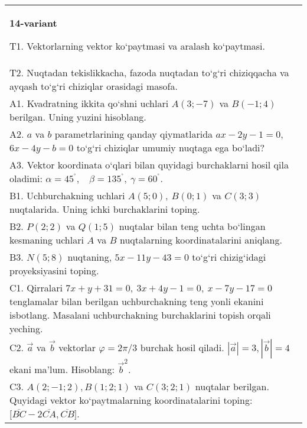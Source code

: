 \documentclass{article}
\begin{document}
\begin{tabular}{m{17cm}}
\textbf{14-variant}

T1. 
Vektorlarning vektor ko‘paytmasi va aralash ko‘paytmasi.
 \\
T2. 
Nuqtadan tekislikkacha, fazoda nuqtadan to‘g‘ri chiziqqacha va ayqash to‘g‘ri chiziqlar orasidagi masofa.
 \\
A1. 
Kvadratning ikkita qo‘shni uchlari $A (3; -7)$ va
$B (-1;4) $ berilgan. Uning yuzini hisoblang.
 \\
A2. 
$a$ va $b$ parametrlarining qanday qiymatlarida
$ax-2y-1=0$, $6x-4y-b=0$ to‘g‘ri chiziqlar umumiy nuqtaga ega bo‘ladi?
 \\
A3. 
Vektor koordinata o‘qlari bilan quyidagi burchaklarni hosil qila oladimi:
$\alpha = 45^{{^\circ}},\ \ \ \ \beta = 135^{{^\circ}},\ \gamma = 60^{{^\circ}}$.
 \\
B1. 
Uchburchakning uchlari \(A (5;0),\ B (0;1) \) va \(C (3;3) \)
nuqtalarida. Uning ichki burchaklarini toping.
 \\
B2. 
\(P (2;2) \) va \(Q (1;5) \) nuqtalar bilan teng uchta
bo‘lingan kesmaning uchlari $A$ va $B$ nuqtalarning
koordinatalarini aniqlang.
 \\
B3. 
\(N (5;8) \) nuqtaning, \(5x-11y-43=0\) to‘g‘ri chizig‘idagi
proyeksiyasini toping.
 \\
C1. 
Qirralari
\(7x+y+31=0,\ 3x+4y-1=0,\ x-7y-17=0\) tenglamalar
bilan berilgan uchburchakning teng yonli ekanini isbotlang.
Masalani uchburchakning
burchaklarini topish orqali yeching.
 \\
C2. 
$\vec{a}$ va $\vec{b}$ vektorlar $\varphi = 2\pi/3$ burchak hosil qiladi. $|\vec{a}| = 3,|\vec{b}| = 4$ ekani ma’lum. Hisoblang:
${\vec{b}}^{2}$.
 \\
C3. 
$A (2; -1;2),B (1;2; 1) $ va $C (3;2;1) $ nuqtalar berilgan. Quyidagi vektor ko‘paytmalarning koordinatalarini toping:
$\lbrack\overline{BC} - 2\overline{CA},\overline{CB}\rbrack$. \\

\end{tabular}
\vspace{1cm}
\end{document}
